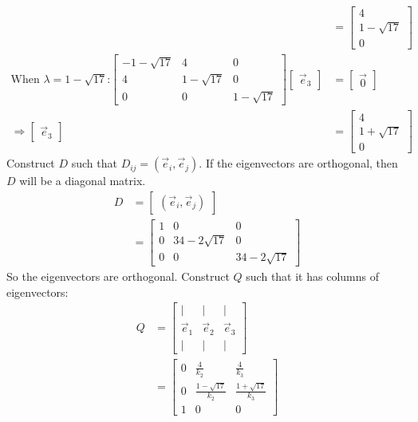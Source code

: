 \documentclass[11pt]{homework}
\begin{document}
\begin{align*}
    &=
    \begin{bmatrix}
    4 \\
    1 - \sqrt{17}\\
    0
    \end{bmatrix} \\
  \text{When $\lambda = 1 - \sqrt{17}$:}
    \begin{bmatrix}
      -1 - \sqrt{17} & 4 & 0 \\
      4 & 1-\sqrt{17}  & 0 \\
      0 & 0 & 1-\sqrt{17}
    \end{bmatrix}
    \begin{bmatrix}
      \vec e_3
    \end{bmatrix}
    &=
    \begin{bmatrix}
      \vec 0
    \end{bmatrix} \\
    \Rightarrow
    \begin{bmatrix}
      \vec e_3
    \end{bmatrix}
    &=
    \begin{bmatrix}
    4 \\
    1 + \sqrt{17}\\
    0
    \end{bmatrix}
\end{align*}
Construct $D$ such that $D_{ij} = (\vec e_i, \vec e_j)$. 
If the eigenvectors are orthogonal, 
then $D$ will be a diagonal matrix.
\begin{align*}
D &= 
  \begin{bmatrix}
  (\vec e_i, \vec e_j)
  \end{bmatrix} \\
  &=
  \begin{bmatrix}
  1 & 0 & 0 \\
  0 & 34 - 2 \sqrt{17} & 0 \\
  0 & 0 & 34 - 2 \sqrt{17} 
  \end{bmatrix}
\end{align*}
So the eigenvectors are orthogonal.
Construct $Q$ such that it has
columns of eigenvectors:
\begin{align*}
Q &= 
  \begin{bmatrix}
  | & | & |  \\
  \vec e_1 & \vec e_2 & \vec e_3 \\
  | & | & |
  \end{bmatrix}\\
  &=
  \begin{bmatrix}
  0 & \frac{4}{k_2}           & \frac{4}{k_3} \\
  0 & \frac{1- \sqrt{17}}{k_2} & \frac{1+\sqrt{17}}{k_3} \\
  1 & 0 & 0
  \end{bmatrix}
\end{align*}
\end{document}
